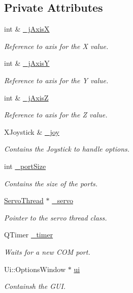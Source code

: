 \subsection*{Private Attributes}
\begin{DoxyCompactItemize}
\item 
int \& \hyperlink{a00005_a01d6284355011203ee6e8856a0bdf557}{\+\_\+j\+Axis\+X}
\begin{DoxyCompactList}\small\item\em Reference to axis for the X value. \end{DoxyCompactList}\item 
int \& \hyperlink{a00005_a8921d1cc5bcb527466c28feb5dcc59b1}{\+\_\+j\+Axis\+Y}
\begin{DoxyCompactList}\small\item\em Reference to axis for the Y value. \end{DoxyCompactList}\item 
int \& \hyperlink{a00005_a47409f50a87942706baaea3d025785e3}{\+\_\+j\+Axis\+Z}
\begin{DoxyCompactList}\small\item\em Reference to axis for the Z value. \end{DoxyCompactList}\item 
X\+Joystick \& \hyperlink{a00005_a1bf846ab681ab245f70adac30999947c}{\+\_\+joy}
\begin{DoxyCompactList}\small\item\em Contains the Joystick to handle options. \end{DoxyCompactList}\item 
int \hyperlink{a00005_a9bd4dccc7a544b1db78dc8cf330b88f6}{\+\_\+port\+Size}
\begin{DoxyCompactList}\small\item\em Contains the size of the ports. \end{DoxyCompactList}\item 
\hyperlink{a00007}{Servo\+Thread} $\ast$ \hyperlink{a00005_acba1566fea3f831000d5e1c1edc3e776}{\+\_\+servo}
\begin{DoxyCompactList}\small\item\em Pointer to the servo thread class. \end{DoxyCompactList}\item 
Q\+Timer \hyperlink{a00005_af6320942b8558140989f552b3bbc1fbd}{\+\_\+timer}
\begin{DoxyCompactList}\small\item\em Waits for a new C\+O\+M port. \end{DoxyCompactList}\item 
Ui\+::\+Options\+Window $\ast$ \hyperlink{a00005_a8347442d5b3b670e8fff0c4102db1f88}{ui}
\begin{DoxyCompactList}\small\item\em Containsh the G\+U\+I. \end{DoxyCompactList}\end{DoxyCompactItemize}


